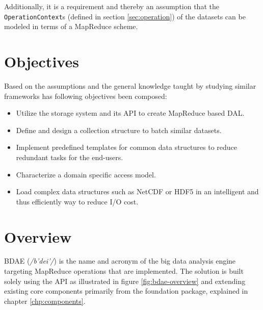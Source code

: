 Additionally, it is a requirement and thereby an assumption that the \texttt{OperationContext}s (defined in section \ref{sec:operation}) of the datasets can be modeled in terms of a MapReduce scheme.

\section{Objectives} \label{sec:bdae-objectives}
Based on the assumptions and the general knowledge taught by studying similar frameworks has following objectives been composed:
\begin{itemize}
	\item Utilize the \CodeName storage system and its API to create MapReduce based DAL.
	\item Define and design a collection structure to batch similar datasets.
	\item Implement predefined templates for common data structures to reduce redundant tasks for the end-users.
	\item Characterize a domain specific access model.
	\item Load complex data structures such as NetCDF\cite{PageNetCDF} or HDF5\cite{PageHDF5}\cite{Collette:2013:Python} in an intelligent and thus efficiently way to reduce I/O cost.
\end{itemize}

\section{Overview}
BDAE (\textit{/b'dei'/}) is the name and acronym of the big data analysis engine targeting MapReduce operations that are implemented. The solution is built solely using the \CodeName API as illustrated in figure \ref{fig:bdae-overview} and extending existing core components primarily from the foundation package, explained in chapter \ref{chp:components}.

